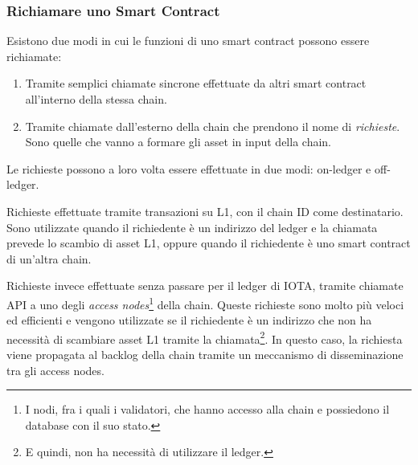 \documentclass[12pt,a4paper,openright,twoside]{report}
\begin{document}
\subsubsection{Richiamare uno Smart Contract}
Esistono due modi in cui le funzioni di uno smart contract possono essere richiamate:
\begin{enumerate}
    \item Tramite semplici chiamate sincrone effettuate da altri smart contract all'interno della stessa chain.
    \item Tramite chiamate dall'esterno della chain che prendono il nome di \textit{richieste}. Sono quelle che vanno a formare gli asset in input della chain.
\end{enumerate}
Le richieste possono a loro volta essere effettuate in due modi: on-ledger e off-ledger.
\begin{description}[font=$\bullet$\:\:,leftmargin=\parindent,labelindent=\parindent]
  \item[Richieste on-ledger] Richieste effettuate tramite transazioni su L1, con il chain ID come destinatario. Sono utilizzate quando il richiedente è un indirizzo del ledger e la chiamata prevede lo scambio di asset L1, oppure quando il richiedente è uno smart contract di un'altra chain.
  \item[Richieste off-ledger] Richieste invece effettuate senza passare per il ledger di IOTA, tramite chiamate API a uno degli \textit{access nodes}\footnote{I nodi, fra i quali i validatori, che hanno accesso alla chain e possiedono il database con il suo stato.} della chain. Queste richieste sono molto più veloci ed efficienti e vengono utilizzate se il richiedente è un indirizzo che non ha necessità di scambiare asset L1 tramite la chiamata\footnote{E quindi, non ha necessità di utilizzare il ledger.}. In questo caso, la richiesta viene propagata al backlog della chain tramite un meccanismo di disseminazione tra gli access nodes.
\end{description}
\end{document}
